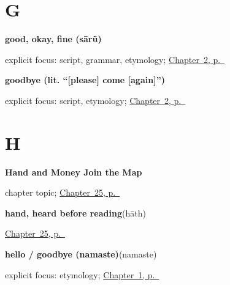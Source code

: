 \section*{G}

\noindent\begin{minipage}[t]{\linewidth}
\raggedright
\textbf{good, okay, fine (sārũ)}\enspace\emph{}\par
\footnotesize explicit focus: script, grammar, etymology; \hyperref[ch:greetings]{Chapter~2, p.~\pageref*{ch:greetings}}
\end{minipage}\par\smallskip

\noindent\begin{minipage}[t]{\linewidth}
\raggedright
\textbf{goodbye (lit. \textquotedblleft{}{[}please{]} come {[}again{]}\textquotedblright{})}\enspace\emph{}\par
\footnotesize explicit focus: script, etymology; \hyperref[ch:greetings]{Chapter~2, p.~\pageref*{ch:greetings}}
\end{minipage}\par\smallskip

\section*{H}

\noindent\begin{minipage}[t]{\linewidth}
\raggedright
\textbf{Hand and Money Join the Map}\par
\footnotesize chapter topic; \hyperref[ch:gu-hand-money-map]{Chapter~25, p.~\pageref*{ch:gu-hand-money-map}}
\end{minipage}\par\smallskip

\noindent\begin{minipage}[t]{\linewidth}
\raggedright
\textbf{hand, heard before reading}\enspace\emph{}\enspace(hāth)\par
\footnotesize \hyperref[ch:gu-hand-money-map]{Chapter~25, p.~\pageref*{ch:gu-hand-money-map}}
\end{minipage}\par\smallskip

\noindent\begin{minipage}[t]{\linewidth}
\raggedright
\textbf{hello / goodbye (namaste)}\enspace\emph{}\enspace(namaste)\par
\footnotesize explicit focus: etymology; \hyperref[ch:first-greeting-script]{Chapter~1, p.~\pageref*{ch:first-greeting-script}}
\end{minipage}\par\smallskip

